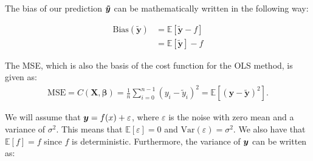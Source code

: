 The bias of our prediction $\boldsymbol{\tilde{y}}$ can be mathematically written in the following way\cite[p. 24]{hastie}:

\begin{align}
    \text{Bias}(\boldsymbol{\tilde{y}}) &= \mathbb{E}[\boldsymbol{\tilde{y}} - f]\\
    &= \mathbb{E}[\boldsymbol{\tilde{y}}] - f
\end{align}
    

The MSE, which is also the basis of the cost function for the OLS method, is given as:
\begin{align}
    \text{MSE} = C(\boldsymbol{X},\boldsymbol{\beta}) =\frac{1}{n}\sum_{i=0}^{n-1}(y_i-\tilde{y}_i)^2=\mathbb{E}\left[(\boldsymbol{y}-\boldsymbol{\tilde{y}})^2\right].
    \label{eq:MSEbiasvar}
\end{align}


We will assume that $\boldsymbol{y} = f(x) + \varepsilon$, where $\varepsilon$ is the noise with zero mean and a variance of $\sigma^2$. This means that $\mathbb{E}[\varepsilon] = 0$ and $\text{Var}(\varepsilon) = \sigma^2$. We also have that $\mathbb{E}[f] = f$ since $f$ is deterministic. Furthermore, the variance of $\boldsymbol{y}$ can be written as:

